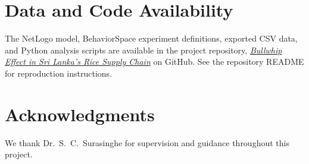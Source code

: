 \documentclass[final,onefignum,onetabnum]{siuro250211}
\begin{document}
\section{Data and Code Availability}
\label{sec:data-availability}

The NetLogo model, BehaviorSpace experiment definitions, exported CSV data, and Python analysis
scripts are available in the project repository,
\href{https://github.com/sara316129/srilanka-rice-supply-chain-bullwhip}{\textit{Bullwhip Effect
in Sri Lanka's Rice Supply Chain}} on GitHub. See the repository README for reproduction
instructions.

\section*{Acknowledgments}
We thank Dr.\ S.\ C.\ Surasinghe for supervision and guidance throughout this project.



\end{document}
